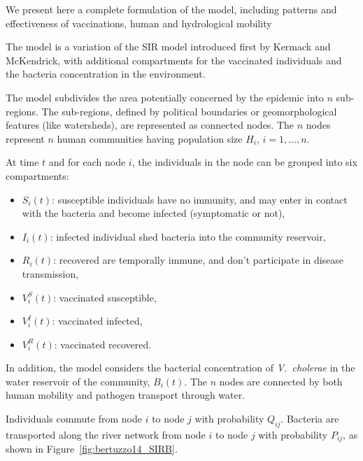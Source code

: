 We present here a complete formulation of the model, including patterns and effectiveness of vaccinations, human and hydrological mobility\cite{Bertuzzo:ProbabilityExtinctionHaiti:2016,Pasetto:RealtimeProjectionsCholera:2017}

The model is a variation of the SIR model introduced first by Kermack and McKendrick\cite{Kermack:ContributionMathematicalTheory:1927}, with additional compartments for the vaccinated individuals and the bacteria concentration in the environment.

The model subdivides the area potentially concerned by the epidemic into $n$ sub-regions. The sub-regions, defined by political boundaries or geomorphological features (like watersheds\cite{Bertuzzo:ProbabilityExtinctionHaiti:2016}), are represented as connected nodes. The $n$ nodes represent $n$ human communities having population size $H_i$, $i=1,\dots, n$. 

At time $t$ and for each node $i$, the individuals in the node can be grouped into six compartments:

\begin{itemize}
\item $S_i(t)$: susceptible individuals  have no immunity, and may enter in contact with the bacteria and become infected (symptomatic or not),
\item $I_i(t)$: infected individual shed bacteria into the community reservoir,
\item $R_i(t)$: recovered are temporally immune, and don't participate in disease transmission,
\item $V^S_i(t)$: vaccinated susceptible,
\item $V^I_i(t)$: vaccinated infected,
\item $V^R_i(t)$: vaccinated recovered.
\end{itemize}

In addition, the model considers the bacterial concentration of \textit{V.~cholerae} in the water reservoir of the community, $B_i(t)$. The $n$ nodes are connected by both human mobility and pathogen transport through water.

Individuals commute from node $i$ to node $j$ with probability $Q_{ij}$. Bacteria are transported along the river network from node $i$ to node $j$ with probability $P_{ij}$, as shown in Figure~\ref{fig:bertuzzo14_SIRB}.


